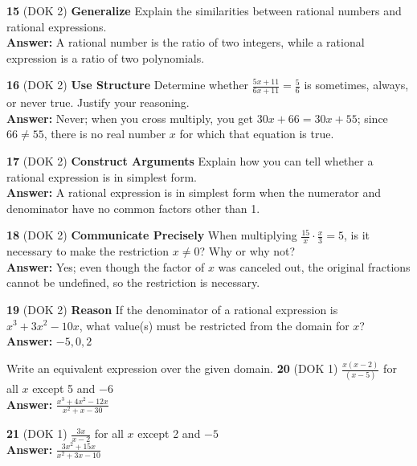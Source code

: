 \documentclass{article}
\newenvironment{practice}[2]{\textbf{#1} (DOK #2)}{}
\newcommand{\answer}[1]{\textbf{Answer:} #1}
\begin{document}
\begin{practice}{15}{2}
\textbf{Generalize} Explain the similarities between rational numbers and rational expressions. \\
\answer{A rational number is the ratio of two integers, while a rational expression is a ratio of two polynomials.}
\end{practice}

\begin{practice}{16}{2}
\textbf{Use Structure} Determine whether $\frac{5x + 11}{6x + 11} = \frac{5}{6}$ is sometimes, always, or never true. Justify your reasoning. \\
\answer{Never; when you cross multiply, you get $30x + 66 = 30x + 55$; since $66 \neq 55$, there is no real number $x$ for which that equation is true.}
\end{practice}

\begin{practice}{17}{2}
\textbf{Construct Arguments} Explain how you can tell whether a rational expression is in simplest form. \\
\answer{A rational expression is in simplest form when the numerator and denominator have no common factors other than 1.}
\end{practice}

\begin{practice}{18}{2}
\textbf{Communicate Precisely} When multiplying $\frac{15}{x} \cdot \frac{x}{3} = 5$, is it necessary to make the restriction $x \neq 0$? Why or why not? \\
\answer{Yes; even though the factor of $x$ was canceled out, the original fractions cannot be undefined, so the restriction is necessary.}
\end{practice}

\begin{practice}{19}{2}
\textbf{Reason} If the denominator of a rational expression is $x^3 + 3x^2 - 10x$, what value(s) must be restricted from the domain for $x$? \\
\answer{$-5, 0, 2$}
\end{practice}

Write an equivalent expression over the given domain.
\begin{practice}{20}{1}
$\frac{x(x - 2)}{(x - 5)}$ for all $x$ except 5 and $-6$ \\
\answer{$\frac{x^3 + 4x^2 - 12x}{x^2 + x - 30}$}
\end{practice}

\begin{practice}{21}{1}
$\frac{3x}{x - 2}$ for all $x$ except 2 and $-5$ \\
\answer{$\frac{3x^2 + 15x}{x^2 + 3x - 10}$}
\end{practice}
\end{document}
